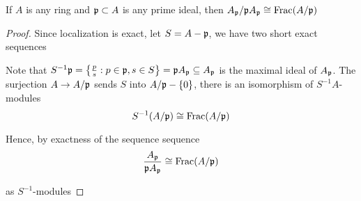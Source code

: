 \begin{problem}
	If $A$ is any ring and $\mf{p} \subset A$ is any prime ideal, then $A_\mf{p} / \mf{p} A_\mf{p} \cong \Frac(A / \mf{p})$
\end{problem}

\begin{proof}
	Since localization is exact, let $S = A - \mf{p}$, we have two short exact sequences
	\begin{center}
	\end{center}
	
	Note that $S^{-1} \mf{p} = \set*{\frac{p}{s}: p \in \mf{p}, s \in S} = \mf{p} A_\mf{p} \subseteq A_\mf{p}$ is the maximal ideal of $A_\mf{p}$. The surjection $A \to A / \mf{p}$ sends $S$ into $A / \mf{p} - \set{0}$, there is an isomorphism of $S^{-1} A$-modules
	$$
		S^{-1} (A / \mf{p}) \cong \Frac(A / \mf{p})
	$$
	
	Hence, by exactness of the sequence sequence
	$$
		\frac{A_\mf{p}}{\mf{p} A_\mf{p}} \cong \Frac(A / \mf{p})
	$$
	
	as $S^{-1}$-modules
\end{proof}
